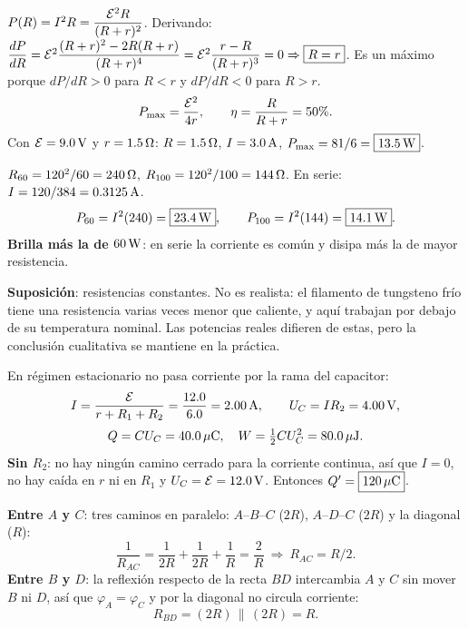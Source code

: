 $P(R)=I^2R=\dfrac{\fem^2R}{(R+r)^2}$. Derivando: $\dfrac{dP}{dR}=\fem^2\dfrac{(R+r)^2-2R(R+r)}{(R+r)^4}=\fem^2\dfrac{r-R}{(R+r)^3}=0\Rightarrow\boxed{R=r}$. Es un máximo porque $dP/dR>0$ para $R<r$ y $dP/dR<0$ para $R>r$.
\[
P_{\max}=\frac{\fem^2}{4r},\qquad\eta=\frac{R}{R+r}=50\%.
\]
Con $\fem=9.0\uu V$ y $r=1.5\ohm$: $R=1.5\ohm$, $I=3.0\uu A$, $P_{\max}=81/6=\boxed{13.5\uu W}$.

$R_{60}=120^2/60=240\ohm$, $R_{100}=120^2/100=144\ohm$. En serie: $I=120/384=0.3125\uu A$.
\[
P_{60}=I^2(240)=\boxed{23.4\uu W},\qquad P_{100}=I^2(144)=\boxed{14.1\uu W}.
\]
\textbf{Brilla más la de $60\uu W$}: en serie la corriente es común y disipa más la de mayor resistencia.

\textbf{Suposición}: resistencias constantes. No es realista: el filamento de tungsteno frío tiene una resistencia varias veces menor que caliente, y aquí trabajan por debajo de su temperatura nominal. Las potencias reales difieren de estas, pero la conclusión cualitativa se mantiene en la práctica.

\begin{center}\circSunoQdiecinueve\end{center}
En régimen estacionario no pasa corriente por la rama del capacitor:
\[
I=\frac{\fem}{r+R_1+R_2}=\frac{12.0}{6.0}=2.00\uu A,\qquad U_C=IR_2=4.00\uu V,
\]
\[
Q=CU_C=40.0\uu{\mu C},\quad W=\tfrac12CU_C^2=80.0\uu{\mu J}.
\]
\textbf{Sin $R_2$}: no hay ningún camino cerrado para la corriente continua, así que $I=0$, no hay caída en $r$ ni en $R_1$ y $U_C=\fem=12.0\uu V$. Entonces $Q'=\boxed{120\uu{\mu C}}$.

\begin{center}\circCuadrado\end{center}
\textbf{Entre $A$ y $C$}: tres caminos en paralelo: $A$--$B$--$C$ ($2R$), $A$--$D$--$C$ ($2R$) y la diagonal ($R$):
\[
\frac1{R_{AC}}=\frac1{2R}+\frac1{2R}+\frac1R=\frac2R\ \Rightarrow\ \boxed{R_{AC}=R/2}.
\]
\textbf{Entre $B$ y $D$}: la reflexión respecto de la recta $BD$ intercambia $A$ y $C$ sin mover $B$ ni $D$, así que $\varphi_A=\varphi_C$ y por la diagonal no circula corriente:
\[
R_{BD}=(2R)\,\|\,(2R)=\boxed{R}.
\]
